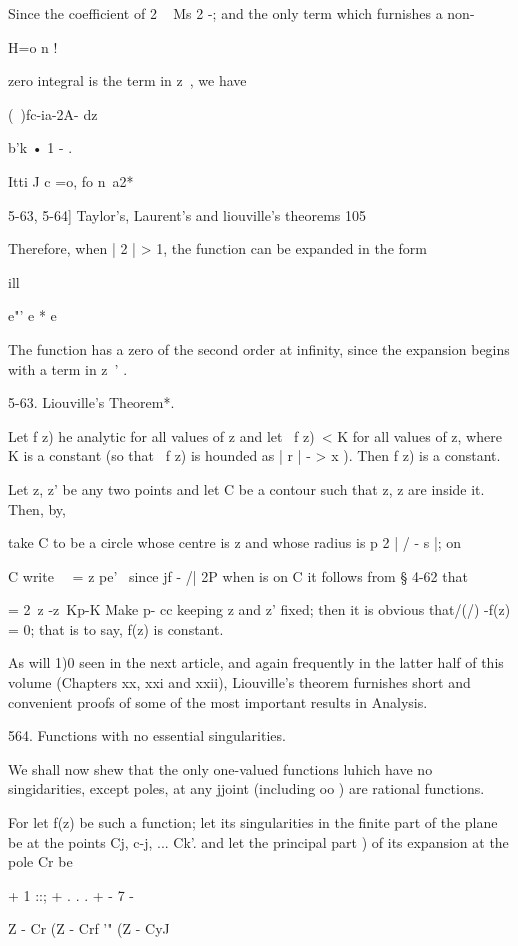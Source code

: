 {{{{Since the coefficient of 2 ~ Ms 2 -; and the only term which
furnishes a non-

H=o n !

zero integral is the term in z~, we have

(\ )fc-ia-2A- dz

b'k • 1 - .

Itti J c =o, fo n\ a2*

5-63, 5-64] Taylor's, Laurent's and liouville's theorems 105

Therefore, when | 2 | > 1, the function can be expanded in the form

ill

e"' e * e

The function has a zero of the second order at infinity, since the
expansion begins with a term in z~' .

5-63. Liouville's Theorem*.

Let f z) he analytic for all values of z and let \ f z)\ < K for all
values of z, where K is a constant (so that \ f z) is hounded as | r |
- > x ). Then f z) is a constant.

Let z, z' be any two points and let C be a contour such that z, z are
inside it. Then, by,

take C to be a circle whose centre is z and whose radius is p 2 | / -
s |; on

C write \ \ = z pe' \ since jf - /| 2P when is on C it follows from §
4-62 that

= 2\ z -z\ Kp-K Make p- cc keeping z and z' fixed; then it is obvious
that/(/) -f(z) = 0; that is to say, f(z) is constant.

As will 1)0 seen in the next article, and again frequently in the
latter half of this volume (Chapters xx, xxi and xxii), Liouville's
theorem furnishes short and convenient proofs of some of the most
important results in Analysis.

564. Functions with no essential singularities.

We shall now shew that the only one-valued functions luhich have no
singidarities, except poles, at any jjoint (including oo ) are
rational functions.

For let f(z) be such a function; let its singularities in the finite
part of the plane be at the points Cj, c-j, ... Ck'. and let the
principal part ) of its expansion at the pole Cr be

+ 1 ::; + . . . + - 7 -

Z - Cr (Z - Crf '" (Z - CyJ

}}}}
